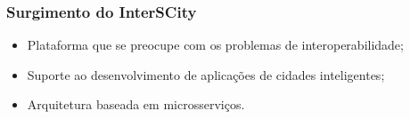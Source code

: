 \begin{frame}
    \frametitle{Surgimento do InterSCity}
    \begin{itemize}
        \item Plataforma que se preocupe com os problemas de interoperabilidade;
        \item Suporte ao desenvolvimento de aplicações de cidades inteligentes;
        \item Arquitetura baseada em microsserviços.
    \end{itemize}
\end{frame}
